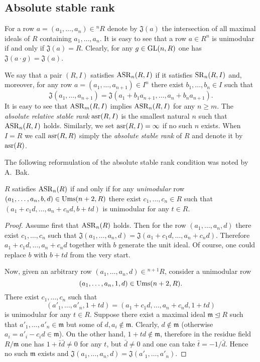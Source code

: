 \subsection{Absolute stable rank}
For a row $a=(a_1,\ldots,a_n)\in{}^n\!R$ denote by $\mathfrak{J}(a)$ the intersection of all maximal ideals of $R$ containing $a_1,\ldots,a_n$.
It is easy to see that a row $a\in R^n$ is unimodular if and only if $\mathfrak{J}(a)=R$. 
Clearly, for any $g\in\operatorname{GL}(n,R)$ one has $\mathfrak{J}(a\cdot g)=\mathfrak{J}(a)$.
\begin{dfn}
We say that a pair $(R,I)$ satisfies $\operatorname{ASR}_n(R,I)$ if it satisfies $\operatorname{SR}_n(R,I)$ and, moreover, for any row $a=(a_1,\ldots,a_{n+1})\in I^n$ there exist $b_1,\ldots,b_n\in I$ such that
\[\mathfrak{J}(a_1,\ldots,a_{n+1})=\mathfrak{J}(a_1+b_1a_{n+1},\ldots,a_n+b_na_{n+1}).\]
It is easy to see that $\operatorname{ASR}_m(R,I)$ implies $\operatorname{ASR}_n(R,I)$ for any $n\geqslant m$. The \emph{absolute relative stable rank} $\operatorname{asr}(R,I)$ is the smallest natural $n$ such that $\operatorname{ASR}_n(R, I)$ holds. Similarly, we set $\operatorname{asr}(R,I)=\infty$ if no such $n$ exists. When $I=R$ we call $\operatorname{asr}(R, R)$ simply the \emph{absolute stable rank} of $R$ and denote it by $\operatorname{asr}(R)$.
\end{dfn}
The following reformulation of the absolute stable rank condition was noted by A.~Bak.
\begin{lemma}
$R$ satisfies $\operatorname{ASR}_n(R)$ if and only if for any \emph{unimodular} row $(a_1,\ldots,a_n,b,d)\in\operatorname{Ums}(n+2,R)$ there exist $c_1,\ldots,c_n\in R$ such that $(a_1+c_1d,\ldots,a_n+c_nd,b+td)$ is unimodular for any $t\in R$.
\end{lemma}
\begin{proof}
Assume first that $\operatorname{ASR}_n(R)$ holds. Then for the row $(a_1,\ldots,a_n,d)$ there exist $c_1,\ldots,c_n$ such that $\mathfrak{J}(a_1,\ldots,a_n,d)=\mathfrak{J}(a_1+c_1d,\ldots,a_n+c_nd)$. Therefore $a_1+c_1d,\ldots,a_n+c_nd$ together with $b$ generate the unit ideal. Of course, one could replace $b$ with $b+td$ from the very start.

Now, given an arbitrary row $(a_1,\ldots,a_n,d)\in{}^{n+1}\!R$, consider a unimodular row
\[ (a_1,\ldots,a_n,1,d)\in\operatorname{Ums}(n+2,R). \]
There exist $c_1,\ldots,c_n$ such that
\[(a'_1,\ldots,a'_n,1+td)=(a_1+c_1d,\ldots,a_n+c_nd,1+td)\]
is unimodular for any $t\in R$. Suppose there exist a maximal ideal $\mathfrak{m}\trianglelefteq R$ such that $a'_1,\ldots,a'_n\in\mathfrak{m}$ but some of $d,a_i\notin\mathfrak{m}$. Clearly, $d\notin\mathfrak{m}$ (otherwise $a_i=a'_i-c_id\in\mathfrak{m}$). On the other hand, $1+td\notin\mathfrak{m}$, therefore in the residue field $R/\mathfrak{m}$ one has $1+\bar{t}\bar{d}\neq0$ for any $t$, but $\bar{d}\neq0$ and one can take $\bar{t}=-1/\bar{d}$. Hence no such $\mathfrak{m}$ exists and $\mathfrak{J}(a_1,\ldots,a_n,d)=\mathfrak{J}(a'_1,\ldots,a'_n)$.
\end{proof}

